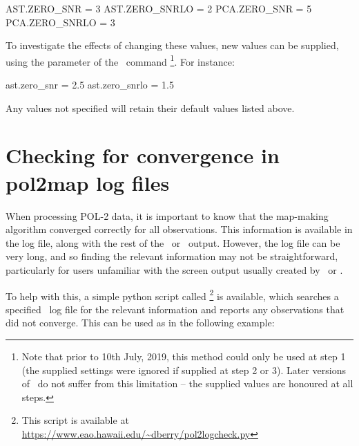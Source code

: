 \begin{terminalv}
AST.ZERO_SNR = 3 
AST.ZERO_SNRLO = 2 
PCA.ZERO_SNR = 5 
PCA.ZERO_SNRLO = 3
\end{terminalv}

To investigate the effects of changing these values, new values can be supplied, using the 
 parameter of the \poltwomap\ command \footnote{Note that prior to 10th July, 2019, this method could only be used at step 1 (the supplied settings were ignored if supplied at step 2 or 3). Later versions of \poltwomap\ do not suffer from this limitation -- the supplied values are honoured at all steps.}. For instance:

\begin{terminalv}
ast.zero_snr = 2.5
ast.zero_snrlo = 1.5
\end{terminalv}

Any values not specified will retain their default values listed above.


\section{Checking for convergence in pol2map log files}

When processing POL-2 data, it is important to know that the map-making algorithm converged 
correctly for all observations. This information is available in the \poltwomap log file, along with 
the rest of the \makemap\ or \skyloop\ output.  However, the log file can be very long, and 
so finding the relevant information may not be straightforward, particularly for users unfamiliar 
with the screen output usually created by \makemap\ or \skyloop.

To help with this, a simple python script called \footnote{This script is available at \url{https://www.eao.hawaii.edu/~dberry/pol2logcheck.py}} is available, which searches a specified \poltwomap\ log file for the relevant information and reports any observations that did not converge. This can be used as in the following example:


